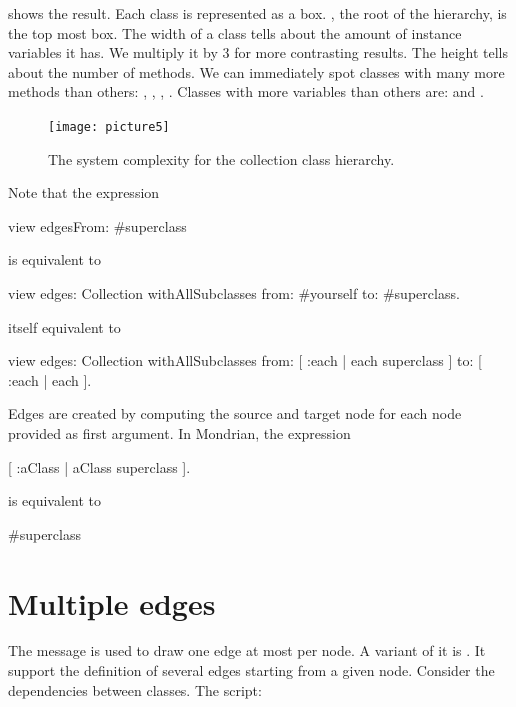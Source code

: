 \documentclass[a4paper,10pt,twoside]{book}
\begin{document}
 shows the result. Each class is represented as a box. , the root of the hierarchy, is the top most box. The width of a class tells about the amount of instance variables it has. We multiply it by 3 for more contrasting results. The height tells about the number of methods. We can immediately spot classes with many more methods than others: , , , . Classes with more variables than others are:  and .

\begin{figure}[htbp]
\centerline{\texttt{[image: picture5]}}
\caption{The system complexity for the collection class hierarchy.}
\label{fig:picture5}
\end{figure}

Note that the expression 
\begin{code}{}
view edgesFrom: #superclass
\end{code}

is equivalent to

\begin{code}{}
view edges: Collection withAllSubclasses from: #yourself to: #superclass.
\end{code}

itself equivalent to
\begin{code}{}
view 
  edges: Collection withAllSubclasses 
  from: [ :each | each superclass ] 
  to: [ :each | each  ].
\end{code}

Edges are created by computing the source and target node for each node provided as first argument.  In Mondrian, the expression 

\begin{code}{}
[ :aClass | aClass superclass ].
\end{code}

is equivalent to
\begin{code}{}
#superclass
\end{code}

\section{Multiple edges}

The message  is used to draw one edge at most per node. A variant of it is . It support the definition of several edges starting from a given node. Consider the dependencies between classes. The script: 
\end{document}
